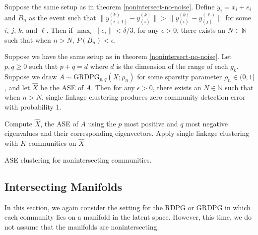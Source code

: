 \documentclass[12pt]{article}
\begin{document}
\begin{theorem}
\label{nonintersect-with-noise}
Suppose the same setup as in theorem \ref{nonintersect-no-noise}. 
Define $y_i = x_i + e_i$ and $B_n$ as the event such that $\|y_{(i+1)}^{(k)} - y_{(i)}^{(k)}\| > \|y_{(i)}^{(k)} - y_{(j)}^{(\ell)}\|$ for some $i$, $j$, $k$, and $\ell$. 
Then if $\max_i \|e_i\| < \delta / 3$, for any $\epsilon > 0$, there exists an $N \in \mathbb{N}$ such that when $n > N$, $P(B_n) < \epsilon$. 
\end{theorem}

\begin{theorem}
\label{nonintersect-mbm}
Suppose we have the same setup as in theorem \ref{nonintersect-no-noise}. 
Let $p, q \geq 0$ such that $p + q = d$ where $d$ is the dimension of the range of each $g_k$. 
Suppose we draw $A \sim \mathrm{GRDPG}_{p,q}(X; \rho_n)$ for some sparsity parameter $\rho_n \in (0, 1]$, and let $\hat{X}$ be the ASE of $A$. 
Then for any $\epsilon > 0$, there exists an $N \in \mathbb{N}$ such that when $n > N$, single linkage clustering produces zero community detection error with probability 1. 
\end{theorem}

\begin{algorithm}[h]
\DontPrintSemicolon
\SetAlgoLined
{}
Compute $\hat{X}$, the ASE of $A$ using the $p$ most positive and $q$ most negative eigenvalues and their corresponding eigenvectors.\;
Apply single linkage clustering with $K$ communities on $\hat{X}$\;
\caption{ASE clustering for nonintersecting communities.}
\end{algorithm}

\hypertarget{intersecting-manifolds}{%
\subsection{Intersecting Manifolds}\label{intersecting-manifolds}}

In this section, we again consider the setting for the RDPG or GRDPG in
which each community lies on a manifold in the latent space. However,
this time, we do not assume that the manifolds are nonintersecting.
\end{document}
